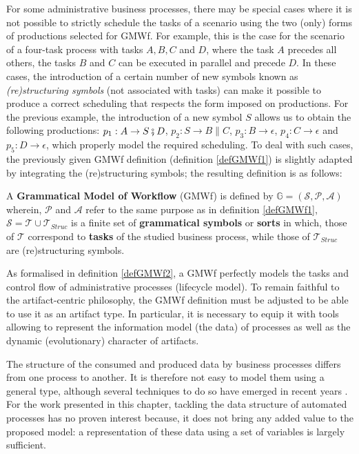 For some administrative business processes, there may be special cases where it is not possible to strictly schedule the tasks of a scenario using the two (only) forms of productions selected for GMWf. For example, this is the case for the scenario of a four-task process with tasks $A, B, C$ and $D$, where the task $A$ precedes all others, the tasks $B$ and $C$ can be executed in parallel and precede $D$. 
In these cases, the introduction of a certain number of new symbols known as \textit{(re)structuring symbols} (not associated with tasks) can make it possible to produce a correct scheduling that respects the form imposed on productions. For the previous example, the introduction of a new symbol $S$ allows us to obtain the following productions: $p_1: A \rightarrow S \fatsemi D$, $p_2: S \rightarrow B \parallel C$, $p_3:B \rightarrow \epsilon$, $p_4:C \rightarrow \epsilon$ and $p_5:D \rightarrow \epsilon$, which properly model the required scheduling. 
To deal with such cases, the previously given GMWf definition (definition \ref{defGMWf1}) is slightly adapted by integrating the (re)structuring symbols; the resulting definition is as follows:
\begin{definition} 
	\label{defGMWf2}
	A \textbf{Grammatical Model of Workflow} (GMWf) is defined by $\mathbb{G}=\left(\mathcal{S},\mathcal{P},\mathcal{A}\right)$
	wherein, 
	$\mathcal{P}$ and $\mathcal{A}$ refer to the same purpose as in definition \ref{defGMWf1}, 
	$\mathcal{S}=\mathcal{T} \cup \mathcal{T}_{Struc}$ 
	is a finite set of \textbf{grammatical symbols} or \textbf{sorts} in which, those of $\mathcal{T}$ correspond to \textbf{tasks} of the studied business process, while those of $\mathcal{T}_{Struc}$ are (re)structuring symbols.
\end{definition}

\label{chap3:sec:gmwf-as-artifact-type}
As formalised in definition \ref{defGMWf2}, a GMWf perfectly models the tasks and control flow of administrative processes (lifecycle model). To remain faithful to the artifact-centric philosophy, the GMWf definition must be adjusted to be able to use it as an artifact type. In particular, it is necessary to equip it with tools allowing to represent the information model (the data) of processes as well as the dynamic (evolutionary) character of artifacts.

\label{chap3:sec:gmwf-information-model}
The structure of the consumed and produced data by business processes differs from one process to another. It is therefore not easy to model them using a general type, although several techniques to do so have emerged in recent years \cite{badouel14}. For the work presented in this chapter, tackling the data structure of automated processes has no proven interest because, it does not bring any added value to the proposed model: a representation of these data using a set of variables is largely sufficient.

